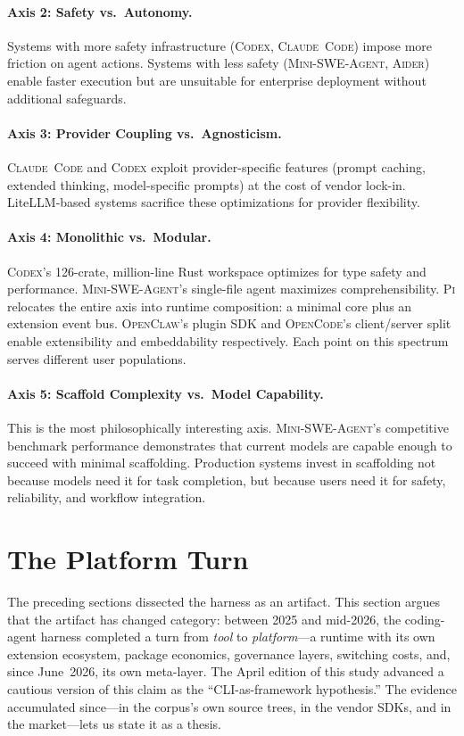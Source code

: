 \documentclass[11pt,a4paper]{article}
\newcommand{\clcode}{\textsc{Claude~Code}\xspace}
\newcommand{\cdx}{\textsc{Codex}\xspace}
\newcommand{\adr}{\textsc{Aider}\xspace}
\newcommand{\mswe}{\textsc{Mini-SWE-Agent}\xspace}
\newcommand{\ocl}{\textsc{OpenClaw}\xspace}
\newcommand{\pib}{\textsc{Pi}\xspace}
\newcommand{\ocd}{\textsc{OpenCode}\xspace}
\begin{document}
\paragraph{Axis 2: Safety vs.\ Autonomy.}
Systems with more safety infrastructure (\cdx{}, \clcode{}) impose more friction on agent actions.
Systems with less safety (\mswe{}, \adr{}) enable faster execution but are unsuitable for enterprise deployment without additional safeguards.

\paragraph{Axis 3: Provider Coupling vs.\ Agnosticism.}
\clcode{} and \cdx{} exploit provider-specific features (prompt caching, extended thinking, model-specific prompts) at the cost of vendor lock-in.
LiteLLM-based systems sacrifice these optimizations for provider flexibility.

\paragraph{Axis 4: Monolithic vs.\ Modular.}
\cdx{}'s 126-crate, million-line Rust workspace optimizes for type safety and performance.
\mswe{}'s single-file agent maximizes comprehensibility.
\pib{} relocates the entire axis into runtime composition: a minimal core plus an extension event bus.
\ocl{}'s plugin SDK and \ocd{}'s client/server split enable extensibility and embeddability respectively.
Each point on this spectrum serves different user populations.

\paragraph{Axis 5: Scaffold Complexity vs.\ Model Capability.}
This is the most philosophically interesting axis.
\mswe{}'s competitive benchmark performance demonstrates that current models are capable enough to succeed with minimal scaffolding.
Production systems invest in scaffolding not because models need it for task completion, but because users need it for safety, reliability, and workflow integration.

\section{The Platform Turn}
\label{sec:platformturn}

The preceding sections dissected the harness as an artifact.
This section argues that the artifact has changed category: between 2025 and mid-2026, the coding-agent harness completed a turn from \emph{tool} to \emph{platform}---a runtime with its own extension ecosystem, package economics, governance layers, switching costs, and, since June~2026, its own meta-layer.
The April edition of this study advanced a cautious version of this claim as the ``CLI-as-framework hypothesis.''
The evidence accumulated since---in the corpus's own source trees, in the vendor SDKs, and in the market---lets us state it as a thesis.
\end{document}
